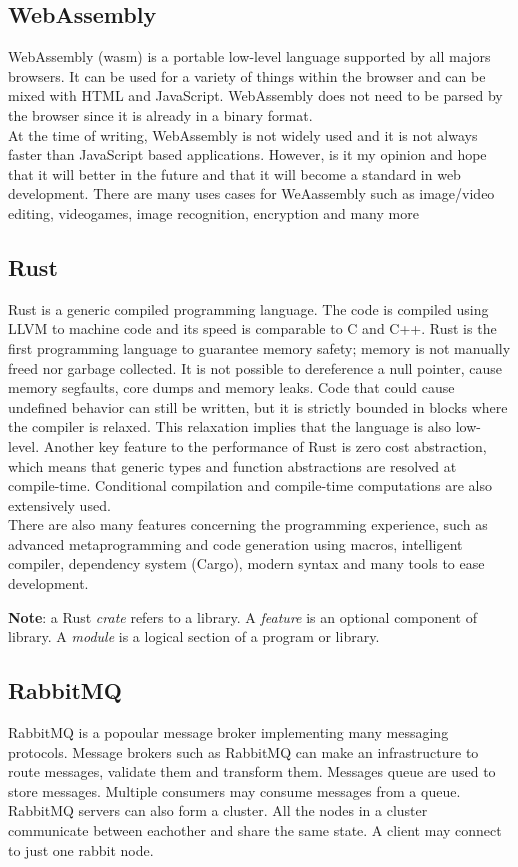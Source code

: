 \documentclass[../documentation.tex]{subfiles}
\begin{document}
\subsection{WebAssembly}

WebAssembly\cite{webassembly} (wasm) is a portable low-level language supported by all majors browsers.
It can be used for a variety of things within the browser and can be mixed
with HTML and JavaScript.
WebAssembly does not need to be parsed by the browser since it is already
in a binary format. \\
At the time of writing, WebAssembly is not widely used
and it is not always faster than JavaScript based applications.
However, is it my opinion and hope that it will
better in the future and that it will become a standard in
web development.
There are many uses cases for WeAassembly such as
image/video editing, videogames, image recognition, encryption and many more\cite{webassemblyusecases}

\subsection{Rust}

Rust\cite{rust} is a generic compiled programming language.
The code is compiled using LLVM to machine code and its speed
is comparable to C and C++.
Rust is the first programming language to guarantee memory safety;
memory is not manually freed nor garbage collected.
It is not possible to dereference a null pointer, cause memory segfaults, core dumps
and memory leaks.
Code that could cause undefined behavior can still be written,
but it is strictly bounded in blocks where the compiler is relaxed.
This relaxation implies that the language is also low-level.
Another key feature to the performance of Rust is zero cost abstraction,
which means that generic types and function abstractions are resolved at compile-time.
Conditional compilation and compile-time computations are also extensively used.
\\
There are also many features concerning the programming experience, such as
advanced metaprogramming and code generation using macros, intelligent compiler,
dependency system (Cargo), modern syntax and many tools to ease development.

\textbf{\color{red} Note}: a Rust \textit{crate} refers to a library.
A \textit{feature} is an optional component of library.
A \textit{module} is a logical section of a program or library.

\subsection{RabbitMQ}

RabbitMQ\cite{rabbitmq} is a popoular message broker implementing many messaging protocols.
Message brokers such as RabbitMQ can make an infrastructure to route messages,
validate them and transform them. Messages queue are used
to store messages. Multiple consumers may consume messages from a queue. \\
RabbitMQ servers can also form a cluster.
All the nodes in a cluster communicate between eachother and share the same
state. A client may connect to just one rabbit node.
\end{document}
